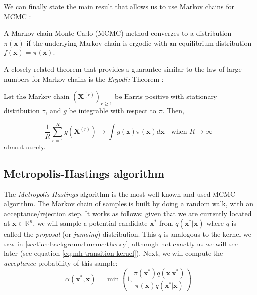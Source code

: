 \documentclass[12pt]{memoir}
\newcommand{\mb}{\mathbf}
\newcommand{\ti}{\textit}
\begin{document}
We can finally state the main result that allows us to use Markov chains for MCMC \cite{mcmc:RobertCasella2004}:

\begin{boxedthm}

    A Markov chain Monte Carlo (MCMC) method converges to a distribution $\pi(\mb x)$ if the underlying Markov chain is ergodic with an equilibrium distribution $f(\mb x) = \pi (\mb x)$.

\end{boxedthm}


A closely related theorem that provides a guarantee similar to the law of large numbers for Markov chains is the \ti{Ergodic} Theorem \cite{mcmc:slides:Rigon2024Mar}:


\begin{boxedthm}

    Let the Markov chain $(\mb X^{(r)})_{r\geq 1}$ be Harris positive with stationary distribution $\pi$, and $g$ be integrable with respect to $\pi$. Then,

    \begin{equation}
        \frac{1}{R}\sum_{r=1}^{R}g(\mb X^{(r)}) \rightarrow \int g(\mb x) \pi(\mb x) d \mb x \quad \text{when } R \rightarrow \infty
    \end{equation}
almost surely.

\end{boxedthm}


\subsection{Metropolis-Hastings algorithm}\label{section:Metropolis-Hastings}

The \ti{Metropolis-Hastings} algorithm is the most well-known and used MCMC algorithm. The Markov chain of samples is built by doing a random walk, with an acceptance/rejection step. It works as follows: given that we are currently located at $\mb x \in \mathbb{R}^n$, we will sample a potential candidate $\mb x^*$ from $q(\mb x^*|\mb x)$ where $q$ is called the \ti{proposal} (or \ti{jumping}) distribution. This $q$ is analogous to the kernel we saw in \ref{section:background:mcmc:theory}, although not exactly as we will see later (see equation \ref{eq:mh-transition-kernel}). Next, we will compute the \ti{acceptance} probability of this sample:
\begin{equation}
    \alpha(\mb x^*, \mb x) = \min\left(1, \frac{\pi(\mb x^*) q(\mb x|\mb x^*)}{\pi(\mb x) q(\mb x^*|\mb x)}\right)
\end{equation}
\end{document}
